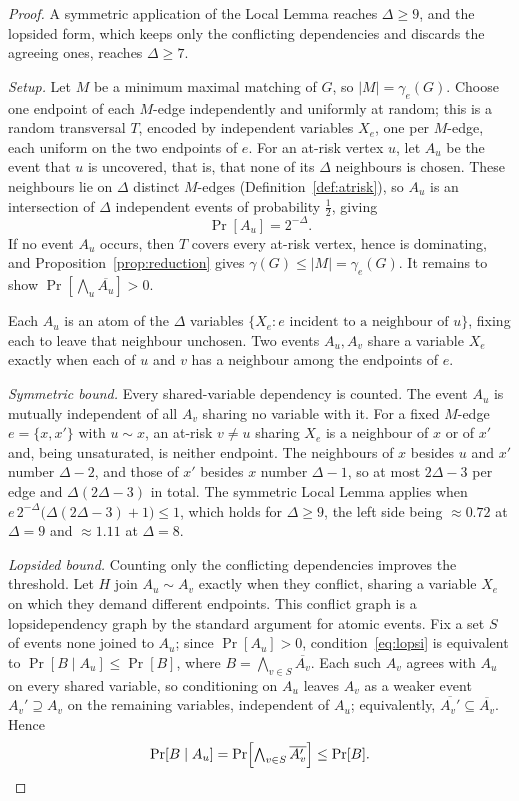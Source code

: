 \documentclass[10pt,a4paper]{amsart}
\newcommand{\edom}{\gamma_{e}}
\begin{document}
\begin{proof}
A symmetric application of the Local Lemma
reaches $\Delta \ge 9$, and the lopsided form, which keeps only the conflicting
dependencies and discards the agreeing ones, reaches $\Delta \ge 7$.

\medskip\noindent
\emph{Setup.} Let $M$ be a minimum maximal matching of $G$, so $|M| = \edom(G)$. Choose one
endpoint of each $M$-edge independently and uniformly at random; this is a
random transversal $T$, encoded by independent variables $X_e$, one per $M$-edge,
each uniform on the two endpoints of $e$. For an at-risk vertex $u$, let $A_u$ be
the event that $u$ is uncovered, that is, that none of its $\Delta$ neighbours is
chosen. These neighbours lie on $\Delta$ distinct $M$-edges
(Definition~\ref{def:atrisk}), so $A_u$ is an
intersection of $\Delta$ independent events of probability $\tfrac12$, giving
\[
  \Pr[A_u] = 2^{-\Delta}.
\]
If no event $A_u$ occurs, then $T$ covers every at-risk vertex, hence is
dominating, and Proposition~\ref{prop:reduction} gives
$\gamma(G) \le |M| = \edom(G)$. It remains to show
$\Pr[\bigwedge_u \overline{A_u}] > 0$.

\medskip\noindent
Each $A_u$ is an atom of the $\Delta$ variables $\{X_e : e \text{ incident to a
neighbour of } u\}$, fixing each to leave that neighbour unchosen. Two events
$A_u, A_v$ share a variable $X_e$ exactly when each of $u$ and $v$ has a neighbour
among the endpoints of $e$.

\medskip\noindent
\emph{Symmetric bound.} Every shared-variable dependency is counted. The event
$A_u$ is mutually independent of all $A_v$ sharing no variable with it. For a fixed $M$-edge
$e = \{x, x'\}$ with $u \sim x$, an at-risk $v \neq u$
sharing $X_e$ is a neighbour of $x$ or of $x'$ and, being unsaturated, is
neither endpoint. The
neighbours of $x$ besides $u$ and $x'$ number $\Delta-2$, and those of $x'$
besides $x$ number $\Delta-1$, so at most $2\Delta-3$ per edge and
$\Delta(2\Delta-3)$ in total. The
symmetric Local Lemma applies when $e\,2^{-\Delta}\bigl(\Delta(2\Delta-3)+1\bigr)
\le 1$, which holds for $\Delta \ge 9$, the left side being $\approx 0.72$ at
$\Delta = 9$ and $\approx 1.11$ at $\Delta = 8$.

\medskip\noindent
\emph{Lopsided bound.} Counting only the conflicting dependencies improves the
threshold. Let $H$ join
$A_u \sim A_v$ exactly when they conflict, sharing a variable $X_e$ on which they
demand different endpoints. This conflict graph is a lopsidependency graph by the
standard argument for atomic events. Fix a set $S$ of events none joined to
$A_u$; since $\Pr[A_u] > 0$, condition~\eqref{eq:lopsi} is equivalent to
$\Pr[B \mid A_u] \le \Pr[B]$, where $B = \bigwedge_{v \in S}\overline{A_v}$. Each
such $A_v$ agrees with $A_u$ on every shared variable, so conditioning on
$A_u$ leaves $A_v$ as a weaker event $A_v' \supseteq A_v$ on the remaining variables,
independent of $A_u$; equivalently, $\overline{A_v'} \subseteq \overline{A_v}$. Hence
\[
  \Pr[B \mid A_u] = \Pr\Bigl[\textstyle\bigwedge_{v\in S}\overline{A_v'}\Bigr]
  \le \Pr[B].
\]


\end{proof}
\end{document}
